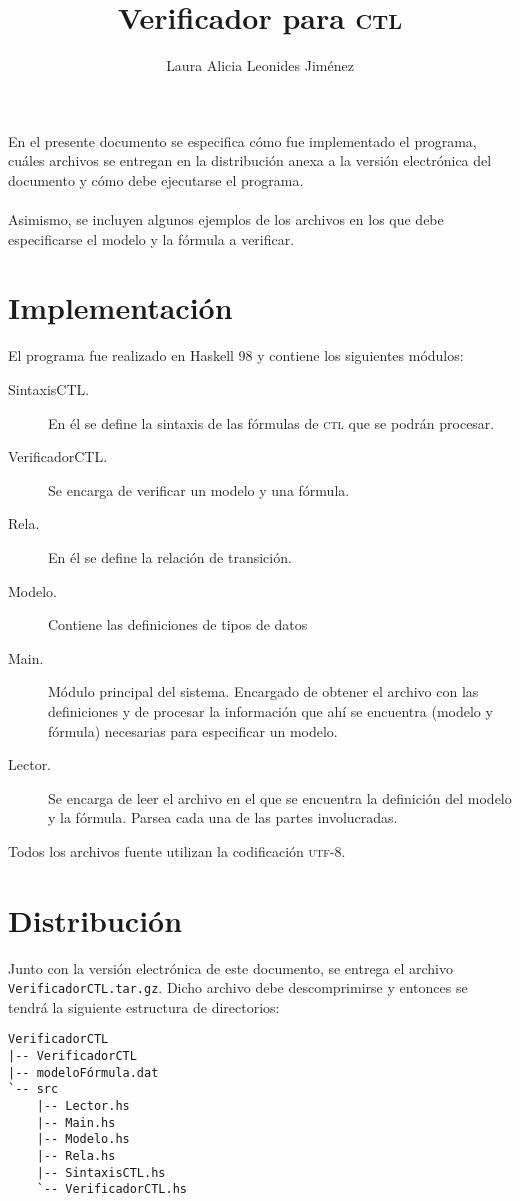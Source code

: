 \documentclass[12pt,letterpaper,spanish]{article}
\author{Laura Alicia Leonides Jiménez}
\title{Verificador para \textsc{ctl}}
\date{ }
\begin{document}
\maketitle

En el presente documento se especifica cómo fue implementado el programa, cuáles archivos
se entregan en la distribución anexa a la versión electrónica del documento y cómo debe
ejecutarse el programa.
\\\\
Asimismo, se incluyen algunos ejemplos de los archivos en los que debe especificarse el modelo
y la fórmula a verificar.

\section{Implementación}
El programa fue realizado en Haskell 98 y contiene los siguientes módulos:
\begin{description}
 \item [SintaxisCTL.] En él se define la sintaxis de las
fórmulas de \textsc{ctl} que se podrán procesar.
 \item [VerificadorCTL.] Se encarga de verificar un modelo y una fórmula.
 \item [Rela.] En él se define la relación de transición.
 \item [Modelo.] Contiene las definiciones de tipos de datos
 \item [Main.] Módulo principal del sistema. Encargado de obtener el archivo
con las definiciones y de procesar la información que ahí se encuentra (modelo y fórmula)
necesarias para especificar un modelo.
 \item [Lector.] Se encarga de leer el archivo en el que se encuentra
la definición del modelo y la fórmula. Parsea cada una de las partes involucradas.
\end{description}

Todos los archivos fuente utilizan la codificación \textsc{utf}-8.

\section{Distribución}
Junto con la versión electrónica de este documento, se entrega el archivo \texttt{VerificadorCTL.tar.gz}.
Dicho archivo debe descomprimirse y entonces se tendrá la siguiente estructura de directorios:
\begin{verbatim}
VerificadorCTL
|-- VerificadorCTL
|-- modeloFórmula.dat
`-- src
    |-- Lector.hs
    |-- Main.hs
    |-- Modelo.hs
    |-- Rela.hs
    |-- SintaxisCTL.hs
    `-- VerificadorCTL.hs
\end{verbatim}
\end{document}
